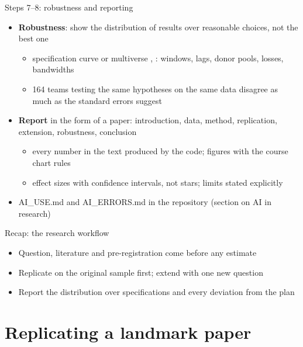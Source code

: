 \begin{frame}{Steps 7--8: robustness and reporting}
\itemsize{\small}
\begin{itemize}
    \item \textbf{Robustness}: show the distribution of results over reasonable choices, not the best one
    \begin{itemize}
        \item specification curve or multiverse , : windows, lags, donor pools, losses, bandwidths
        \item 164 teams testing the same hypotheses on the same data disagree as much as the standard errors suggest 
    \end{itemize}
    \item \textbf{Report} in the form of a paper: introduction, data, method, replication, extension, robustness, conclusion
    \begin{itemize}
        \item every number in the text produced by the code; figures with the course chart rules
        \item effect sizes with confidence intervals, not stars; limits stated explicitly
    \end{itemize}
    \item AI\_USE.md and AI\_ERRORS.md in the repository (section on AI in research)
\end{itemize}
\end{frame}

\begin{frame}{Recap: the research workflow}
\itemsize{\small}
\begin{itemize}
    \item Question, literature and pre-registration come before any estimate
    \item Replicate on the original sample first; extend with one new question
    \item Report the distribution over specifications and every deviation from the plan
\end{itemize}
\end{frame}


\section{Replicating a landmark paper}

